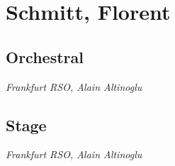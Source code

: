 \chapter{Schmitt, Florent}
\label{cha:schmitt}


\section{Orchestral}

 \textit{Frankfurt RSO, Alain Altinoglu} 

\section{Stage}

 \textit{Frankfurt RSO, Alain Altinoglu} 